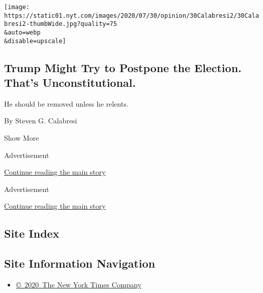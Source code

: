 \begin{enumerate}
  \texttt{[image: https://static01.nyt.com/images/2020/07/30/opinion/30Calabresi2/30Calabresi2-thumbWide.jpg?quality=75\\\&auto=webp\\\&disable=upscale]}

  \hypertarget{trump-might-try-to-postpone-the-election-thats-unconstitutional}{%
  \subsection{Trump Might Try to Postpone the Election. That's
  Unconstitutional.}\label{trump-might-try-to-postpone-the-election-thats-unconstitutional}}

  He should be removed unless he relents.

  By Steven G. Calabresi
\end{enumerate}

Show More

Advertisement

\protect\hyperlink{after-mid1}{Continue reading the main story}

Advertisement

\protect\hyperlink{after-mktg}{Continue reading the main story}

\hypertarget{site-index}{%
\subsection{Site Index}\label{site-index}}

\hypertarget{site-information-navigation}{%
\subsection{Site Information
Navigation}\label{site-information-navigation}}

\begin{itemize}
\tightlist
\item
  \href{https://help.nytimes.com/hc/en-us/articles/115014792127-Copyright-notice}{©~2020~The
  New York Times Company}
\end{itemize}

